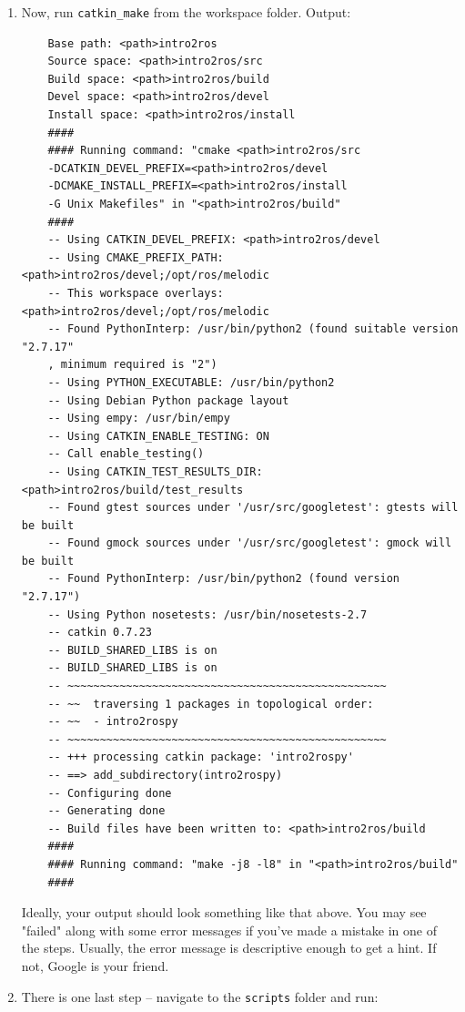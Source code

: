 \documentclass{article}
\begin{document}
\begin{enumerate}
        \item Now, run \texttt{catkin_make} from the workspace folder. Output:
        \begin{verbatim}
    Base path: <path>intro2ros
    Source space: <path>intro2ros/src
    Build space: <path>intro2ros/build
    Devel space: <path>intro2ros/devel
    Install space: <path>intro2ros/install
    ####
    #### Running command: "cmake <path>intro2ros/src 
    -DCATKIN_DEVEL_PREFIX=<path>intro2ros/devel 
    -DCMAKE_INSTALL_PREFIX=<path>intro2ros/install 
    -G Unix Makefiles" in "<path>intro2ros/build"
    ####
    -- Using CATKIN_DEVEL_PREFIX: <path>intro2ros/devel
    -- Using CMAKE_PREFIX_PATH: <path>intro2ros/devel;/opt/ros/melodic
    -- This workspace overlays: <path>intro2ros/devel;/opt/ros/melodic
    -- Found PythonInterp: /usr/bin/python2 (found suitable version "2.7.17"
    , minimum required is "2") 
    -- Using PYTHON_EXECUTABLE: /usr/bin/python2
    -- Using Debian Python package layout
    -- Using empy: /usr/bin/empy
    -- Using CATKIN_ENABLE_TESTING: ON
    -- Call enable_testing()
    -- Using CATKIN_TEST_RESULTS_DIR: <path>intro2ros/build/test_results
    -- Found gtest sources under '/usr/src/googletest': gtests will be built
    -- Found gmock sources under '/usr/src/googletest': gmock will be built
    -- Found PythonInterp: /usr/bin/python2 (found version "2.7.17") 
    -- Using Python nosetests: /usr/bin/nosetests-2.7
    -- catkin 0.7.23
    -- BUILD_SHARED_LIBS is on
    -- BUILD_SHARED_LIBS is on
    -- ~~~~~~~~~~~~~~~~~~~~~~~~~~~~~~~~~~~~~~~~~~~~~~~~~
    -- ~~  traversing 1 packages in topological order:
    -- ~~  - intro2rospy
    -- ~~~~~~~~~~~~~~~~~~~~~~~~~~~~~~~~~~~~~~~~~~~~~~~~~
    -- +++ processing catkin package: 'intro2rospy'
    -- ==> add_subdirectory(intro2rospy)
    -- Configuring done
    -- Generating done
    -- Build files have been written to: <path>intro2ros/build
    ####
    #### Running command: "make -j8 -l8" in "<path>intro2ros/build"
    ####
        \end{verbatim}
        Ideally, your output should look something like that above. You may see "failed" along
        with some error messages if you've made a mistake in one of the steps. Usually, the 
        error message is descriptive enough to get a hint. If not, Google is your friend.
        \item There is one last step -- navigate to the \texttt{scripts} folder 
        and run:
        \begin{verbatim}

\end{verbatim}
\end{enumerate}
\end{document}
